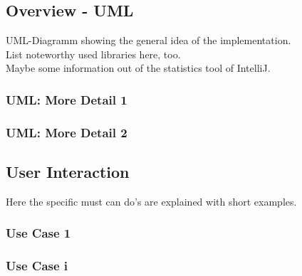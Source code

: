 \pagebreak
\subsection{Overview - UML}

UML-Diagramm showing the general idea of the implementation.\\
List noteworthy used libraries here, too.\\
Maybe some information out of the statistics tool of IntelliJ.

\subsubsection{UML: More Detail 1}
\subsubsection{UML: More Detail 2}

\pagebreak
\subsection{User Interaction}

\noindent Here the specific must can do's are explained with short examples.
\subsubsection{Use Case 1}
\subsubsection{Use Case i}

\pagebreak